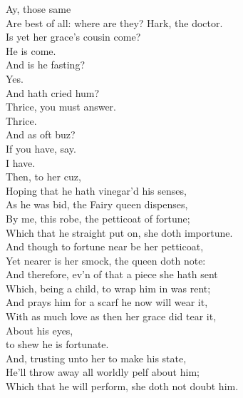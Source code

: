 \documentclass[a4paper,oneside]{memoir}
\begin{document}
\begin{drama*}
\facespeaks {} Ay, those same\\
Are best of all: where are they? Hark, the doctor.\\
\subtlespeaks {} Is yet her grace's cousin come?\\
\facespeaks He is come.\\
\subtlespeaks {} And is he fasting?\\
\facespeaks {} Yes.\\
\subtlespeaks {} And hath cried hum?\\
\facespeaks Thrice, you must answer.\\
\dapperspeaks {} Thrice.\\
\subtlespeaks {} And as oft buz?\\
\facespeaks If you have, say.\\
\dapperspeaks {} I have.\\
\subtlespeaks {} Then, to her cuz,\\
Hoping that he hath vinegar'd his senses,\\
As he was bid, the Fairy queen dispenses,\\
By me, this robe, the petticoat of fortune;\\
Which that he straight put on, she doth importune.\\
And though to fortune near be her petticoat,\\
Yet nearer is her smock, the queen doth note:\\
And therefore, ev'n of that a piece she hath sent\\
Which, being a child, to wrap him in was rent;\\
And prays him for a scarf he now will wear it,\\
With as much love as then her grace did tear it,\\
About his eyes,\\
to shew he is fortunate.\\
And, trusting unto her to make his state,\\
He'll throw away all worldly pelf about him;\\
Which that he will perform, she doth not doubt him.\\

\end{drama*}
\end{document}
